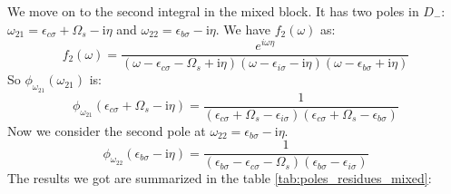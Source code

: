 \documentclass[12pt]{caltech_thesis}
\begin{document}
We move on to the second integral in the mixed block. It has two poles in $D_-$: $\omega_{21} = \epsilon _{c\sigma } + \Omega_s - \mathrm{i} \eta$ and $\omega_{22} = \epsilon _{b \sigma } - \mathrm{i} \eta$. We have $f_2(\omega)$ as:
\begin{equation}
f_2(\omega) = \frac{e^{i\omega \eta }}{(\omega-\epsilon_{c \sigma}-\Omega_s+\mathrm{i} \eta)(\omega-\epsilon_{i \sigma}-\mathrm{i} \eta)(\omega-\epsilon_{b \sigma}+\mathrm{i} \eta)}
\end{equation}
So $\phi_{\omega_{21}}(\omega _{21})$ is:
\begin{equation}
{\phi_{\omega_{21}}(\epsilon_{c \sigma} + \Omega_s - \mathrm{i} \eta) = \frac{1}{(\epsilon_{c \sigma} + \Omega_s -\epsilon_{i \sigma})(\epsilon_{c \sigma} + \Omega_s -\epsilon_{b \sigma})}}
\end{equation}
Now we consider the second pole at $\omega_{22} = \epsilon _{b \sigma } - \mathrm{i} \eta$.
\begin{equation}
{\phi_{\omega_{22}}(\epsilon_{b \sigma} - \mathrm{i} \eta) = \frac{1}{(\epsilon_{b \sigma} -\epsilon_{c \sigma}-\Omega_s)(\epsilon_{b \sigma} -\epsilon_{i \sigma})}}
\end{equation}
The results we got are summarized in the table \ref{tab:poles_residues_mixed}:\\
\end{document}
